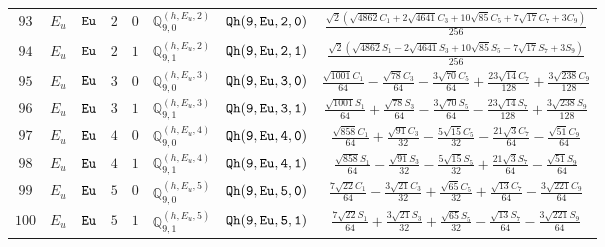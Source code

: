 \documentclass[fleqn,8pt]{jsarticle}
\begin{document}
\begin{table}[ht!]
\begin{center}
\begin{tabular}{cccccccc}
$ 93 $ & $ E_{u} $ & $ {\tt Eu} $ & $ 2 $ & $ 0 $ & $ \mathbb{Q}_{9,0}^{(h,E_{u},2)} $ & $ {\tt Qh(9,Eu,2,0)} $ & $ \frac{\sqrt{2} \left(\sqrt{4862} C_{1} + 2 \sqrt{4641} C_{3} + 10 \sqrt{85} C_{5} + 7 \sqrt{17} C_{7} + 3 C_{9}\right)}{256} $ \\
$ 94 $ & $ E_{u} $ & $ {\tt Eu} $ & $ 2 $ & $ 1 $ & $ \mathbb{Q}_{9,1}^{(h,E_{u},2)} $ & $ {\tt Qh(9,Eu,2,1)} $ & $ \frac{\sqrt{2} \left(\sqrt{4862} S_{1} - 2 \sqrt{4641} S_{3} + 10 \sqrt{85} S_{5} - 7 \sqrt{17} S_{7} + 3 S_{9}\right)}{256} $ \\
$ 95 $ & $ E_{u} $ & $ {\tt Eu} $ & $ 3 $ & $ 0 $ & $ \mathbb{Q}_{9,0}^{(h,E_{u},3)} $ & $ {\tt Qh(9,Eu,3,0)} $ & $ \frac{\sqrt{1001} C_{1}}{64} - \frac{\sqrt{78} C_{3}}{64} - \frac{3 \sqrt{70} C_{5}}{64} + \frac{23 \sqrt{14} C_{7}}{128} + \frac{3 \sqrt{238} C_{9}}{128} $ \\
$ 96 $ & $ E_{u} $ & $ {\tt Eu} $ & $ 3 $ & $ 1 $ & $ \mathbb{Q}_{9,1}^{(h,E_{u},3)} $ & $ {\tt Qh(9,Eu,3,1)} $ & $ \frac{\sqrt{1001} S_{1}}{64} + \frac{\sqrt{78} S_{3}}{64} - \frac{3 \sqrt{70} S_{5}}{64} - \frac{23 \sqrt{14} S_{7}}{128} + \frac{3 \sqrt{238} S_{9}}{128} $ \\
$ 97 $ & $ E_{u} $ & $ {\tt Eu} $ & $ 4 $ & $ 0 $ & $ \mathbb{Q}_{9,0}^{(h,E_{u},4)} $ & $ {\tt Qh(9,Eu,4,0)} $ & $ \frac{\sqrt{858} C_{1}}{64} + \frac{\sqrt{91} C_{3}}{32} - \frac{5 \sqrt{15} C_{5}}{32} - \frac{21 \sqrt{3} C_{7}}{64} - \frac{\sqrt{51} C_{9}}{64} $ \\
$ 98 $ & $ E_{u} $ & $ {\tt Eu} $ & $ 4 $ & $ 1 $ & $ \mathbb{Q}_{9,1}^{(h,E_{u},4)} $ & $ {\tt Qh(9,Eu,4,1)} $ & $ \frac{\sqrt{858} S_{1}}{64} - \frac{\sqrt{91} S_{3}}{32} - \frac{5 \sqrt{15} S_{5}}{32} + \frac{21 \sqrt{3} S_{7}}{64} - \frac{\sqrt{51} S_{9}}{64} $ \\
$ 99 $ & $ E_{u} $ & $ {\tt Eu} $ & $ 5 $ & $ 0 $ & $ \mathbb{Q}_{9,0}^{(h,E_{u},5)} $ & $ {\tt Qh(9,Eu,5,0)} $ & $ \frac{7 \sqrt{22} C_{1}}{64} - \frac{3 \sqrt{21} C_{3}}{32} + \frac{\sqrt{65} C_{5}}{32} + \frac{\sqrt{13} C_{7}}{64} - \frac{3 \sqrt{221} C_{9}}{64} $ \\
$ 100 $ & $ E_{u} $ & $ {\tt Eu} $ & $ 5 $ & $ 1 $ & $ \mathbb{Q}_{9,1}^{(h,E_{u},5)} $ & $ {\tt Qh(9,Eu,5,1)} $ & $ \frac{7 \sqrt{22} S_{1}}{64} + \frac{3 \sqrt{21} S_{3}}{32} + \frac{\sqrt{65} S_{5}}{32} - \frac{\sqrt{13} S_{7}}{64} - \frac{3 \sqrt{221} S_{9}}{64} $ \\
 \hline \hline
\end{tabular}
\end{center}
\end{table}
\end{document}
